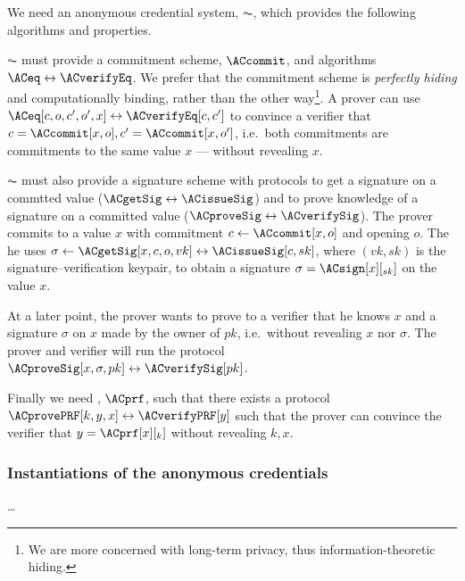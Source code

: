 
We need an anonymous credential system, \(\AC\), which provides the following 
algorithms and properties.


\(\AC\) must provide a commitment scheme, \(\ACcommit\), and algorithms 
\(\ACeq\leftrightarrow \ACverifyEq\).
We prefer that the commitment scheme is \emph{perfectly hiding} and 
computationally binding, rather than the other way\footnote{%
  We are more concerned with long-term privacy, thus information-theoretic 
  hiding.
}.
A prover can use \(\ACeq[c, o, c', o', x]\leftrightarrow \ACverifyEq[c, c']\) to 
convince a verifier that \(c = \ACcommit[x, o], c' = \ACcommit[x, o']\), i.e.\ 
both commitments are commitments to the same value \(x\) --- without revealing 
\(x\).



\(\AC\) must also provide a signature scheme with protocols to get a signature 
on a commtted value (\(\ACgetSig\leftrightarrow \ACissueSig\)) and to prove 
knowledge of a signature on a committed value (\(\ACproveSig\leftrightarrow 
  \ACverifySig\)).
The prover commits to a value \(x\) with commitment \(c\gets \ACcommit[x, o]\) 
and opening \(o\).
The he uses \(\sigma\gets \ACgetSig[x, c, o, vk]\leftrightarrow \ACissueSig[c, 
  sk]\), where \((vk, sk)\) is the signature--verification keypair, to obtain a 
signature \(\sigma = \ACsign[x][_{sk}]\) on the value \(x\).

At a later point, the prover wants to prove to a verifier that he knows \(x\) 
and a signature \(\sigma\) on \(x\) made by the owner of \(pk\), i.e.\ without 
revealing \(x\) nor \(\sigma\).
The prover and verifier will run the protocol \(\ACproveSig[x, \sigma, 
  pk]\leftrightarrow \ACverifySig[pk]\).


Finally we need , \(\ACprf\), such that there exists a protocol 
\(\ACprovePRF[k, y, x]\leftrightarrow \ACverifyPRF[y]\) such that the prover can 
convince the verifier that \(y = \ACprf[x][_k]\) without revealing \(k, x\).

{}


\subsubsection{Instantiations of the anonymous credentials} 

\dots
